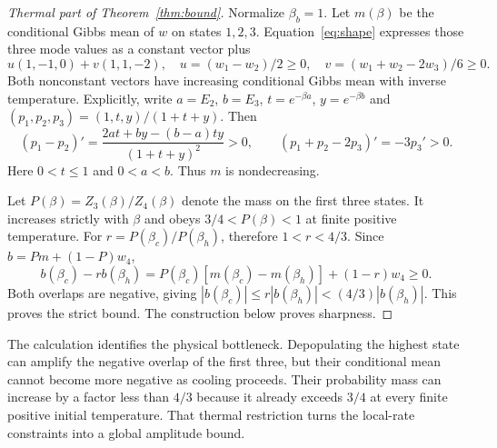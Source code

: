 \documentclass[11pt]{article}
\begin{document}
\begin{proof}[Thermal part of Theorem~\ref{thm:bound}]
Normalize $\beta_b=1$. Let $m(\beta)$ be the conditional Gibbs mean of
$w$ on states $1,2,3$. Equation~\eqref{eq:shape} expresses those three
mode values as a constant vector plus
\[
 u(1,-1,0)+v(1,1,-2),\quad
 u=(w_1-w_2)/2\geq0,\quad
 v=(w_1+w_2-2w_3)/6\geq0.
\]
Both nonconstant vectors have increasing conditional Gibbs mean with
inverse temperature. Explicitly, write $a=E_2$, $b=E_3$,
$t=e^{-\beta a}$, $y=e^{-\beta b}$ and
$(p_1,p_2,p_3)=(1,t,y)/(1+t+y)$. Then
\[
 (p_1-p_2)'=\frac{2at+by-(b-a)ty}{(1+t+y)^2}>0,
 \qquad (p_1+p_2-2p_3)'=-3p_3'>0.
\]
Here $0<t\leq1$ and $0<a<b$. Thus $m$ is nondecreasing.

Let $P(\beta)=Z_3(\beta)/Z_4(\beta)$ denote the mass on the first
three states. It increases strictly with $\beta$ and obeys
$3/4<P(\beta)<1$ at finite positive temperature. For
$r=P(\beta_c)/P(\beta_h)$, therefore $1<r<4/3$.
Since $b=Pm+(1-P)w_4$,
\[
 b(\beta_c)-r b(\beta_h)
 =P(\beta_c)[m(\beta_c)-m(\beta_h)]+(1-r)w_4\geq0.
\]
Both overlaps are negative, giving
$|b(\beta_c)|\leq r|b(\beta_h)|<(4/3)|b(\beta_h)|$.
This proves the strict bound. The construction below proves sharpness.
\end{proof}

The calculation identifies the physical bottleneck. Depopulating the
highest state can amplify the negative overlap of the first three, but
their conditional mean cannot become more negative as cooling proceeds.
Their probability mass can increase by a factor less than $4/3$ because
it already exceeds $3/4$ at every finite positive initial temperature.
That thermal restriction turns the local-rate constraints into a global
amplitude bound.
\end{document}
